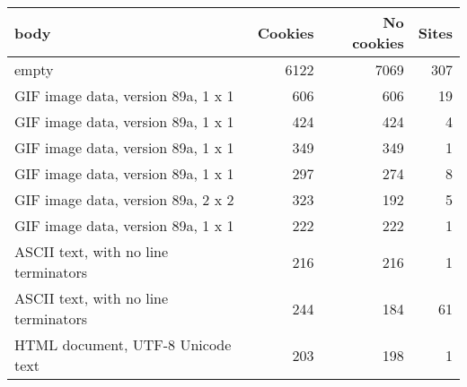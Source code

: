 \begin{tabular}{lrrr}
\toprule
                                body &  Cookies &  No cookies &  Sites \\
\midrule
                               empty &     6122 &        7069 &    307 \\
  GIF image data, version 89a, 1 x 1 &      606 &         606 &     19 \\
  GIF image data, version 89a, 1 x 1 &      424 &         424 &      4 \\
  GIF image data, version 89a, 1 x 1 &      349 &         349 &      1 \\
  GIF image data, version 89a, 1 x 1 &      297 &         274 &      8 \\
  GIF image data, version 89a, 2 x 2 &      323 &         192 &      5 \\
  GIF image data, version 89a, 1 x 1 &      222 &         222 &      1 \\
ASCII text, with no line terminators &      216 &         216 &      1 \\
ASCII text, with no line terminators &      244 &         184 &     61 \\
   HTML document, UTF-8 Unicode text &      203 &         198 &      1 \\
\bottomrule
\end{tabular}
